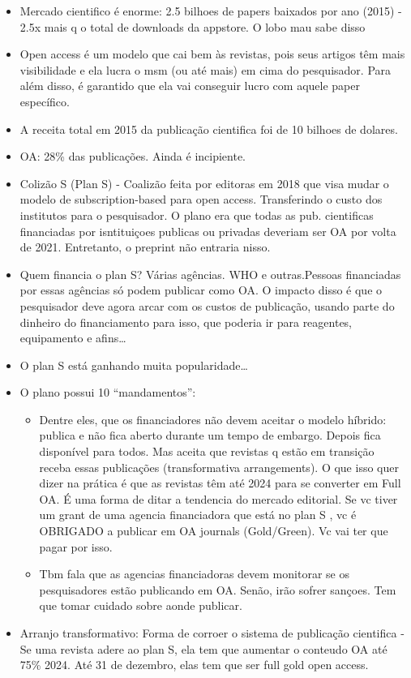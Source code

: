 \documentclass[11pt]{article}
\begin{document}
\begin{itemize}
\begin{itemize}
\begin{itemize}
\item Mercado cientifico é enorme: 2.5 bilhoes de papers baixados por ano (2015) - 2.5x mais q o total de downloads da appstore. O lobo mau sabe disso
\item Open access é um modelo que cai bem às revistas, pois seus artigos têm mais visibilidade e ela lucra o msm (ou até mais) em cima do pesquisador. Para além disso, é garantido que ela vai conseguir lucro com aquele paper específico.
\item A receita total em 2015 da publicação cientifica foi de 10 bilhoes de dolares.
\item OA: 28\% das publicações. Ainda é incipiente.
\item Colizão S (Plan S) - Coalizão feita por editoras em 2018 que visa mudar o modelo de subscription-based para open access. Transferindo o custo dos institutos para o pesquisador. O plano era que todas as pub. cientificas financiadas por isntituiçoes publicas ou privadas deveriam ser OA por volta de 2021. Entretanto, o preprint não entraria nisso.
\item Quem financia o plan S? Várias agências. WHO e outras.Pessoas financiadas por essas agências só podem publicar como OA. O impacto disso é que o pesquisador deve agora arcar com os custos de publicação, usando parte do dinheiro do financiamento para isso, que poderia ir para reagentes, equipamento e afins\ldots{}
\item O plan S está ganhando muita popularidade\ldots{}
\item O plano possui 10 ``mandamentos'':
\begin{itemize}
\item Dentre eles, que os financiadores não devem aceitar o modelo híbrido: publica e não fica aberto durante um tempo de embargo. Depois fica disponível para todos. Mas aceita que revistas q estão em transição receba essas publicações (transformativa arrangements). O que isso quer dizer na prática é que as revistas têm até 2024 para se converter em Full OA. É uma forma de ditar a tendencia do mercado editorial. Se vc tiver um grant de uma agencia financiadora que está no plan S , vc é OBRIGADO a publicar em OA journals (Gold/Green). Vc vai ter que pagar por isso.
\item Tbm fala que as agencias financiadoras devem monitorar se os pesquisadores estão publicando em OA. Senão, irão sofrer sançoes. Tem que tomar cuidado sobre aonde publicar.
\end{itemize}
\item Arranjo transformativo: Forma de corroer o sistema de publicação cientifica - Se uma revista adere ao plan S, ela tem que aumentar o conteudo OA até 75\% 2024. Até 31 de dezembro, elas tem que ser full gold open access.

\end{itemize}
\end{itemize}
\end{itemize}
\end{document}
